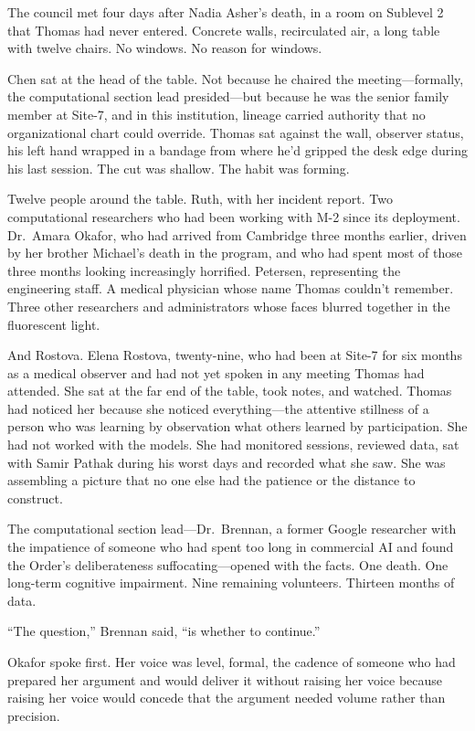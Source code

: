 \scenebreak

The council met four days after Nadia Asher's death, in a room on Sublevel 2 that Thomas had never entered. Concrete walls, recirculated air, a long table with twelve chairs. No windows. No reason for windows.

Chen sat at the head of the table. Not because he chaired the meeting---formally, the computational section lead presided---but because he was the senior family member at Site-7, and in this institution, lineage carried authority that no organizational chart could override. Thomas sat against the wall, observer status, his left hand wrapped in a bandage from where he'd gripped the desk edge during his last session. The cut was shallow. The habit was forming.

Twelve people around the table. Ruth, with her incident report. Two computational researchers who had been working with M-2 since its deployment. Dr.\ Amara Okafor, who had arrived from Cambridge three months earlier, driven by her brother Michael's death in the program, and who had spent most of those three months looking increasingly horrified. Petersen, representing the engineering staff. A medical physician whose name Thomas couldn't remember. Three other researchers and administrators whose faces blurred together in the fluorescent light.

And Rostova. Elena Rostova, twenty-nine, who had been at Site-7 for six months as a medical observer and had not yet spoken in any meeting Thomas had attended. She sat at the far end of the table, took notes, and watched. Thomas had noticed her because she noticed everything---the attentive stillness of a person who was learning by observation what others learned by participation. She had not worked with the models. She had monitored sessions, reviewed data, sat with Samir Pathak during his worst days and recorded what she saw. She was assembling a picture that no one else had the patience or the distance to construct.

The computational section lead---Dr.\ Brennan, a former Google researcher with the impatience of someone who had spent too long in commercial AI and found the Order's deliberateness suffocating---opened with the facts. One death. One long-term cognitive impairment. Nine remaining volunteers. Thirteen months of data.

``The question,'' Brennan said, ``is whether to continue.''

Okafor spoke first. Her voice was level, formal, the cadence of someone who had prepared her argument and would deliver it without raising her voice because raising her voice would concede that the argument needed volume rather than precision.

